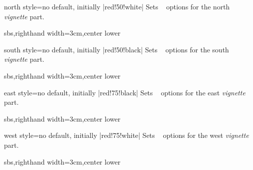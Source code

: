 \begin{vigTcbKey}[][doc new=2016-04-22]{north style}{=}{no default, initially |red!50!white|}
  Sets \tikzname\  options for the north \emph{vignette} part.
\begin{dispExample*}{sbs,righthand width=3cm,center lower}
\end{dispExample*}
\end{vigTcbKey}

\begin{vigTcbKey}[][doc new=2016-04-22]{south style}{=}{no default, initially |red!50!black|}
  Sets \tikzname\  options for the south \emph{vignette} part.
\begin{dispExample*}{sbs,righthand width=3cm,center lower}
\end{dispExample*}
\end{vigTcbKey}


\begin{vigTcbKey}[][doc new=2016-04-22]{east style}{=}{no default, initially |red!75!black|}
  Sets \tikzname\  options for the east \emph{vignette} part.
\begin{dispExample*}{sbs,righthand width=3cm,center lower}
\end{dispExample*}
\end{vigTcbKey}

\clearpage

\begin{vigTcbKey}[][doc new=2016-04-22]{west style}{=}{no default, initially |red!75!white|}
  Sets \tikzname\  options for the west \emph{vignette} part.
\begin{dispExample*}{sbs,righthand width=3cm,center lower}
\end{dispExample*}
\end{vigTcbKey}


